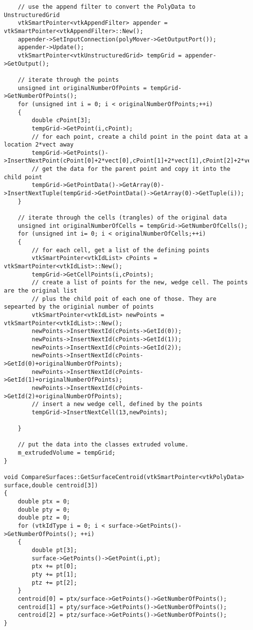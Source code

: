 \begin{lstlisting}
    // use the append filter to convert the PolyData to UnstructuredGrid
    vtkSmartPointer<vtkAppendFilter> appender = vtkSmartPointer<vtkAppendFilter>::New();
    appender->SetInputConnection(polyMover->GetOutputPort());
    appender->Update();
    vtkSmartPointer<vtkUnstructuredGrid> tempGrid = appender->GetOutput();

    // iterate through the points
    unsigned int originalNumberOfPoints = tempGrid->GetNumberOfPoints();
    for (unsigned int i = 0; i < originalNumberOfPoints;++i)
    {
        double cPoint[3];
        tempGrid->GetPoint(i,cPoint);
        // for each point, create a child point in the point data at a location 2*vect away
        tempGrid->GetPoints()->InsertNextPoint(cPoint[0]+2*vect[0],cPoint[1]+2*vect[1],cPoint[2]+2*vect[2]);
        // get the data for the parent point and copy it into the child point
        tempGrid->GetPointData()->GetArray(0)->InsertNextTuple(tempGrid->GetPointData()->GetArray(0)->GetTuple(i));
    }

    // iterate through the cells (trangles) of the original data
    unsigned int originalNumberOfCells = tempGrid->GetNumberOfCells();
    for (unsigned int i= 0; i < originalNumberOfCells;++i)
    {
        // for each cell, get a list of the defining points
        vtkSmartPointer<vtkIdList> cPoints = vtkSmartPointer<vtkIdList>::New();
        tempGrid->GetCellPoints(i,cPoints);
        // create a list of points for the new, wedge cell. The points are the original list
        // plus the child poit of each one of those. They are sepearted by the originial number of points
        vtkSmartPointer<vtkIdList> newPoints = vtkSmartPointer<vtkIdList>::New();
        newPoints->InsertNextId(cPoints->GetId(0));
        newPoints->InsertNextId(cPoints->GetId(1));
        newPoints->InsertNextId(cPoints->GetId(2));
        newPoints->InsertNextId(cPoints->GetId(0)+originalNumberOfPoints);
        newPoints->InsertNextId(cPoints->GetId(1)+originalNumberOfPoints);
        newPoints->InsertNextId(cPoints->GetId(2)+originalNumberOfPoints);
        // insert a new wedge cell, defined by the points
        tempGrid->InsertNextCell(13,newPoints);

    }

    // put the data into the classes extruded volume.
    m_extrudedVolume = tempGrid;
}

void CompareSurfaces::GetSurfaceCentroid(vtkSmartPointer<vtkPolyData> surface,double centroid[3])
{
    double ptx = 0;
    double pty = 0;
    double ptz = 0;
    for (vtkIdType i = 0; i < surface->GetPoints()->GetNumberOfPoints(); ++i)
    {
        double pt[3];
        surface->GetPoints()->GetPoint(i,pt);
        ptx += pt[0];
        pty += pt[1];
        ptz += pt[2];
    }
    centroid[0] = ptx/surface->GetPoints()->GetNumberOfPoints();
    centroid[1] = pty/surface->GetPoints()->GetNumberOfPoints();
    centroid[2] = ptz/surface->GetPoints()->GetNumberOfPoints();
}


\end{lstlisting}
